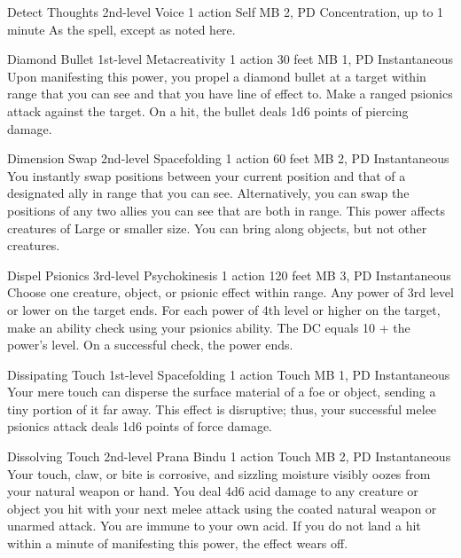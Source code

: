 \DndPowerHeader%
  {Detect Thoughts}
  {2nd-level Voice}
  {1 action}
  {Self}
  {MB 2, PD \lvltwo}
  {Concentration, up to 1 minute}
As the  spell, except as noted here.

\DndPowerHeader%
  {Diamond Bullet}
  {1st-level Metacreativity}
  {1 action}
  {30 feet}
  {MB 1, PD \lvlone}
  {Instantaneous}
  Upon manifesting this power,
  you propel a diamond bullet at a target within range
  that you can see and that you have line of effect to.
  Make a ranged psionics attack against the target.
  On a hit, the bullet deals 1d6 points of piercing damage.

\DndPowerHeader%
  {Dimension Swap}
  {2nd-level Spacefolding}
  {1 action}
  {60 feet}
  {MB 2, PD \lvltwo}
  {Instantaneous}
  You instantly swap positions between your current position
  and that of a designated ally in range that you can see.
  Alternatively, you can swap the positions of
  any two allies you can see that are both in range.
  This power affects creatures of Large or smaller size.
  You can bring along objects, but not other creatures.

\DndPowerHeader%
  {Dispel Psionics}
  {3rd-level Psychokinesis}
  {1 action}
  {120 feet}
  {MB 3, PD \lvlthree}
  {Instantaneous}
  Choose one creature, object, or psionic effect within range.
  Any power of 3rd level or lower on the target ends.
  For each power of 4th level or higher on the target,
  make an ability check using your psionics ability.
  The DC equals 10 + the power's level.
  On a successful check, the power ends.

\DndPowerHeader%
  {Dissipating Touch}
  {1st-level Spacefolding}
  {1 action}
  {Touch}
  {MB 1, PD \lvlone}
  {Instantaneous}
Your mere touch can disperse the surface material of a foe or object,
sending a tiny portion of it far away.
This effect is disruptive; thus,
your successful melee psionics attack deals 1d6 points of force damage.

\DndPowerHeader%
  {Dissolving Touch}
  {2nd-level Prana Bindu}
  {1 action}
  {Touch}
  {MB 2, PD \lvltwo}
  {Instantaneous}
  Your touch, claw, or bite is corrosive,
  and sizzling moisture visibly oozes from your
  natural weapon or hand.
  You deal 4d6 acid damage to any creature or object
  you hit with your next melee attack using the coated
  natural weapon or unarmed attack.
  You are immune to your own acid.
  If you do not land a hit within a minute
  of manifesting this power,
  the effect wears off.

